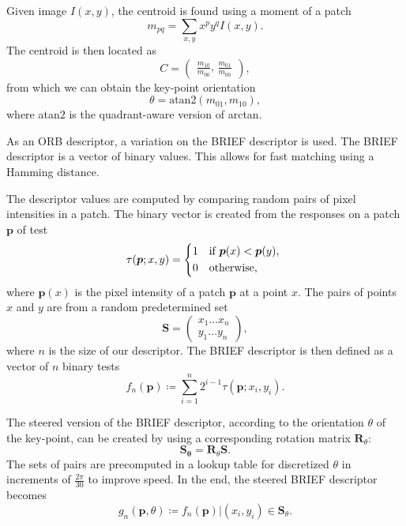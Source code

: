 Given image $I(x,y)$, the centroid is found using a moment of a patch
\begin{equation}
    m_{pq}=\sum_{x,y} x^p y^q I(x,y).
\end{equation}
The centroid is then located as
\begin{equation}
    C =
    \begin{pmatrix}
        \frac{m_{10}}{m_{00}} \text{, } \frac{m_{01}}{m_{00}}
    \end{pmatrix},
\end{equation}
from which we can obtain the key-point orientation
\begin{equation}
    \theta = \text{atan}2(m_{01},m_{10}),
\end{equation}
where atan$2$ is the quadrant-aware version of arctan.

As an ORB descriptor, a variation on the BRIEF descriptor is used. The BRIEF descriptor is a vector of binary values. This allows for fast matching using a Hamming distance.

The descriptor values are computed by comparing random pairs of pixel intensities in a patch. The binary vector is created from the responses on a patch $\boldsymbol{p}$ of test
\begin{equation}
    \tau(\boldsymbol{p};x,y)=
    \begin{cases*}
        1 & if $\boldsymbol{p}(x) < \boldsymbol{p}(y)$, \\
        0 & otherwise,
    \end{cases*}
\end{equation}
where $\boldsymbol{p}(x)$ is the pixel intensity of a patch $\boldsymbol{p}$ at a point $x$. The pairs of points $x$ and $y$ are from a random predetermined set
\begin{equation}
    \boldsymbol{S} =
    \begin{pmatrix}
        x_1 \dots x_n \\
        y_1 \dots y_n
    \end{pmatrix},
\end{equation}
where $n$ is the size of our descriptor. The BRIEF descriptor is then defined as a vector of $n$ binary tests
\begin{equation}
    f_n(\boldsymbol{p}) \coloneqq \sum_{i=1}^{n} 2^{i-1}\tau(\boldsymbol{p};x_i, y_i).
\end{equation}

The steered version of the BRIEF descriptor, according to the orientation $\theta$ of the key-point, can be created by using a corresponding rotation matrix $\boldsymbol{R}_\theta$:
\begin{equation}
    \boldsymbol{S_\theta} = \boldsymbol{R}_\theta \boldsymbol{S}.
\end{equation}
The sets of pairs are precomputed in a lookup table for discretized $\theta$ in increments of $\frac{2\pi}{30}$ to improve speed. In the end, the steered BRIEF descriptor becomes
\begin{equation}
    g_n(\boldsymbol{p}, \theta) \coloneqq f_n(\boldsymbol{p}) | (x_i, y_i) \in \boldsymbol{S}_\theta.
\end{equation}

